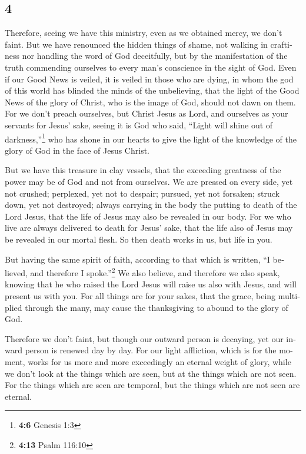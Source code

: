 \begin{paracol}{2}
\begin{otherlanguage}{english}
\hypertarget{section-7}{%
\section{4}\label{section-7}}

 Therefore, seeing we have this ministry, even as we
obtained mercy, we don't faint.  But we have renounced the
hidden things of shame, not walking in craftiness nor handling the word
of God deceitfully, but by the manifestation of the truth commending
ourselves to every man's conscience in the sight of God. 
Even if our Good News is veiled, it is veiled in those who are dying,
 in whom the god of this world has blinded the minds of
the unbelieving, that the light of the Good News of the glory of Christ,
who is the image of God, should not dawn on them.  For we
don't preach ourselves, but Christ Jesus as Lord, and ourselves as your
servants for Jesus' sake,  seeing it is God who said,
``Light will shine out of darkness,''\footnote{\textbf{4:6} Genesis 1:3}
who has shone in our hearts to give the light of the knowledge of the
glory of God in the face of Jesus Christ.

 But we have this treasure in clay vessels, that the
exceeding greatness of the power may be of God and not from ourselves.
 We are pressed on every side, yet not crushed; perplexed,
yet not to despair;  pursued, yet not forsaken; struck
down, yet not destroyed;  always carrying in the body the
putting to death of the Lord Jesus, that the life of Jesus may also be
revealed in our body.  For we who live are always
delivered to death for Jesus' sake, that the life also of Jesus may be
revealed in our mortal flesh.  So then death works in us,
but life in you.

 But having the same spirit of faith, according to that
which is written, ``I believed, and therefore I spoke.''\footnote{\textbf{4:13}
  Psalm 116:10} We also believe, and therefore we also speak,
 knowing that he who raised the Lord Jesus will raise us
also with Jesus, and will present us with you.  For all
things are for your sakes, that the grace, being multiplied through the
many, may cause the thanksgiving to abound to the glory of God.

 Therefore we don't faint, but though our outward person
is decaying, yet our inward person is renewed day by day.
 For our light affliction, which is for the moment, works
for us more and more exceedingly an eternal weight of glory,
 while we don't look at the things which are seen, but at
the things which are not seen. For the things which are seen are
temporal, but the things which are not seen are eternal.


\end{otherlanguage}
\end{paracol}
